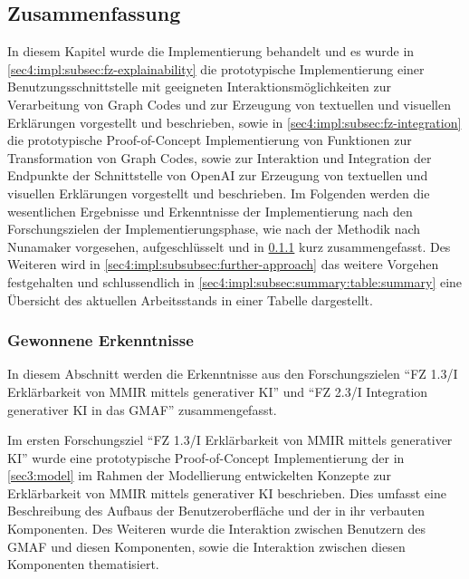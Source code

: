 

\clearpage

\subsection{Zusammenfassung}
\label{sec4:impl:subsec:summary}
In diesem Kapitel wurde die Implementierung behandelt und es wurde in \cref{sec4:impl:subsec:fz-explainability} die prototypische Implementierung einer Benutzungsschnittstelle mit geeigneten Interaktionsmöglichkeiten zur Verarbeitung von Graph Codes und zur Erzeugung von textuellen und visuellen Erklärungen vorgestellt und beschrieben, sowie in \cref{sec4:impl:subsec:fz-integration} die prototypische Proof-of-Concept Implementierung von Funktionen zur Transformation von Graph Codes, sowie zur Interaktion und Integration der Endpunkte der Schnittstelle von OpenAI zur Erzeugung von textuellen und visuellen Erklärungen vorgestellt und beschrieben.
Im Folgenden werden die wesentlichen Ergebnisse und Erkenntnisse der Implementierung nach den Forschungszielen der Implementierungsphase, wie nach der Methodik nach Nunamaker vorgesehen, aufgeschlüsselt und in \cref{sec4:impl:subsubsec:summary-findings} kurz zusammengefasst.
Des Weiteren wird in \cref{sec4:impl:subsubsec:further-approach} das weitere Vorgehen festgehalten und schlussendlich in \cref{sec4:impl:subsec:summary:table:summary} eine Übersicht des aktuellen Arbeitsstands in einer Tabelle dargestellt.

\subsubsection{Gewonnene Erkenntnisse}
\label{sec4:impl:subsubsec:summary-findings}
In diesem Abschnitt werden die Erkenntnisse aus den Forschungszielen \enquote{FZ 1.3/I Erklärbarkeit von MMIR mittels generativer KI} und \enquote{FZ 2.3/I Integration generativer KI in das GMAF} zusammengefasst.

Im ersten Forschungsziel \enquote{FZ 1.3/I Erklärbarkeit von MMIR mittels generativer KI} wurde eine prototypische Proof-of-Concept Implementierung der in \cref{sec3:model} im Rahmen der Modellierung entwickelten Konzepte zur Erklärbarkeit von MMIR mittels generativer KI beschrieben.
Dies umfasst eine Beschreibung des Aufbaus der Benutzeroberfläche und der in ihr verbauten Komponenten.
Des Weiteren wurde die Interaktion zwischen Benutzern des GMAF und diesen Komponenten, sowie die Interaktion zwischen diesen Komponenten thematisiert.

